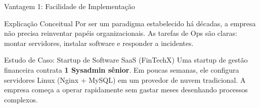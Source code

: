 \documentclass[9pt]{beamer}
\begin{document}
\begin{frame}[fragile]{Vantagem 1: Facilidade de Implementação}
\begin{block}{Explicação Conceitual}
Por ser um paradigma estabelecido há décadas, a empresa não precisa reinventar papéis organizacionais. As tarefas de Ops são claras: montar servidores, instalar software e responder a incidentes.
\end{block}

\vspace{0.2cm}
\begin{exampleblock}{Estudo de Caso: Startup de Software SaaS (FinTechX)}
Uma startup de gestão financeira contrata \textbf{1 Sysadmin sênior}. Em poucas semanas, ele configura servidores Linux (Nginx + MySQL) em um provedor de nuvem tradicional. A empresa começa a operar rapidamente sem gastar meses desenhando processos complexos.
\end{exampleblock}

\vspace{0.2cm}
\begin{center}
\end{center}
\end{frame}
\end{document}
